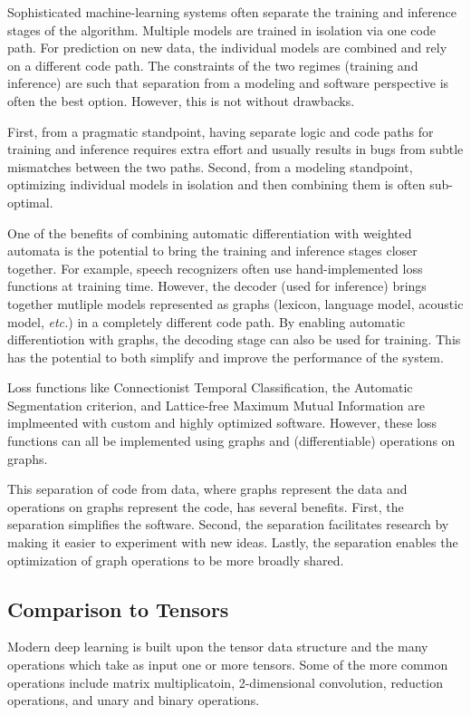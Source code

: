 \documentclass[main.tex]{subfiles}
\begin{document}
Sophisticated machine-learning systems often separate the training and
inference stages of the algorithm. Multiple models are trained in isolation via
one code path. For prediction on new data, the individual models are combined
and rely on a different code path. The constraints of the two regimes (training
and inference) are such that separation from a modeling and software
perspective is often the best option. However, this is not without drawbacks.

First, from a pragmatic standpoint, having separate logic and code paths for
training and inference requires extra effort and usually results in bugs from
subtle mismatches between the two paths. Second, from a modeling standpoint,
optimizing individual models in isolation and then combining them is often
sub-optimal.

One of the benefits of combining automatic differentiation with weighted
automata is the potential to bring the training and inference stages closer
together. For example, speech recognizers often use hand-implemented loss
functions at training time. However, the decoder (used for inference) brings
together mutliple models represented as graphs (lexicon, language model,
acoustic model, \emph{etc.}) in a completely different code path. By enabling
automatic differentiotion with graphs, the decoding stage can also be used for
training.  This has the potential to both simplify and improve the performance
of the system.

Loss functions like Connectionist Temporal Classification, the Automatic
Segmentation criterion, and Lattice-free Maximum Mutual Information are
implmeented with custom and highly optimized software. However, these loss
functions can all be implemented using graphs and (differentiable) operations
on graphs.

This separation of code from data, where graphs represent the data and
operations on graphs represent the code, has several benefits. First, the separation
simplifies the software. Second, the separation facilitates research by making
it easier to experiment with new ideas. Lastly, the separation enables the
optimization of graph operations to be more broadly shared.

\subsection{Comparison to Tensors}

Modern deep learning is built upon the tensor data structure and the many
operations which take as input one or more tensors. Some of the more common
operations include matrix multiplicatoin, 2-dimensional convolution, reduction
operations, and unary and binary operations.
\end{document}
